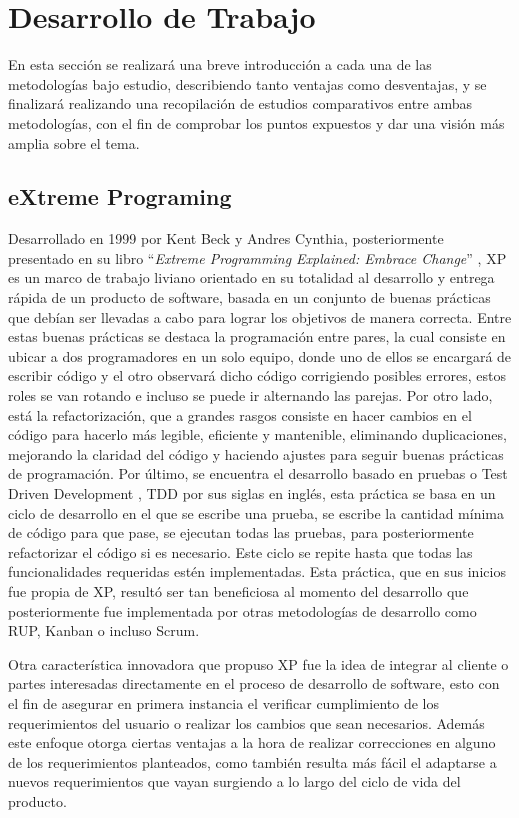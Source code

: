 \documentclass[a4paper,10pt]{article}
\begin{document}
	\section{Desarrollo de Trabajo}
	En esta sección se realizará una breve introducción a cada una de las metodologías bajo estudio, describiendo tanto ventajas como desventajas, y se finalizará realizando una recopilación de estudios comparativos entre ambas metodologías, con el fin de comprobar los puntos expuestos y dar una visión más amplia sobre el tema.
	\subsection{eXtreme Programing}
	Desarrollado en 1999 por Kent Beck y Andres Cynthia, posteriormente presentado en su libro “\textit{Extreme Programming Explained: Embrace Change}” \parencite{Beck_Andres_2005}, XP es un marco de trabajo liviano orientado en su totalidad al desarrollo y entrega rápida de un producto de software, basada en un conjunto de buenas prácticas que debían ser llevadas a cabo para lograr los objetivos de manera correcta. Entre estas buenas prácticas se destaca la programación entre pares, la cual consiste en ubicar a dos programadores en un solo equipo, donde uno de ellos se encargará de escribir código y el otro observará dicho código corrigiendo posibles errores, estos roles se van rotando e incluso se puede ir alternando las parejas. Por otro lado, está la refactorización, que a grandes rasgos consiste en hacer cambios en el código para hacerlo más legible, eficiente y mantenible, eliminando duplicaciones, mejorando la claridad del código y haciendo ajustes para seguir buenas prácticas de programación. Por último, se encuentra el desarrollo basado en pruebas o Test Driven Development \parencite{Beck_2003}, TDD por sus siglas en inglés, esta práctica se basa en un ciclo de desarrollo en el que se escribe una prueba, se escribe la cantidad mínima de código para que pase, se ejecutan todas las pruebas, para posteriormente refactorizar el código si es necesario. Este ciclo se repite hasta que todas las funcionalidades requeridas estén implementadas. Esta práctica, que en sus inicios fue propia de XP, resultó ser tan beneficiosa al momento del desarrollo que posteriormente fue implementada por otras metodologías de desarrollo como RUP, Kanban o incluso Scrum.
	
	Otra característica innovadora que propuso XP fue la idea de integrar al cliente o partes interesadas directamente en el proceso de desarrollo de software, esto con el fin de asegurar en primera instancia el verificar cumplimiento de los requerimientos del usuario o realizar los cambios que sean necesarios. Además este enfoque otorga ciertas ventajas a la hora de realizar correcciones en alguno de los requerimientos planteados, como también resulta más fácil el adaptarse a nuevos requerimientos que vayan surgiendo a lo largo del ciclo de vida del producto.
	
\end{document}
